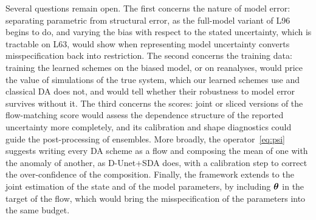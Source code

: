 Several questions remain open. The first concerns the nature of model error: separating
parametric from structural error, as the full-model variant of L96 begins to do, and varying the
bias with respect to the stated uncertainty, which is tractable on L63, would show when
representing model uncertainty converts misspecification back into restriction. The second
concerns the training data: training the learned schemes on the biased model, or on reanalyses,
would price the value of simulations of the true system, which our learned schemes use and
classical DA does not, and would tell whether their robustness to model error survives without
it. The third concerns the scores: joint or sliced versions of the flow-matching score would
assess the dependence structure of the reported uncertainty more completely, and its
calibration and shape diagnostics could guide the post-processing of ensembles. More broadly,
the operator~\eqref{eq:psi} suggests writing every DA scheme as a flow and composing the mean of
one with the anomaly of another, as D-Unet+SDA does, with a calibration step to correct the
over-confidence of the composition. Finally, the framework extends to the joint estimation of
the state and of the model parameters, by including $\boldsymbol{\theta}$ in the target of the flow, which
would bring the misspecification of the parameters into the same budget.

